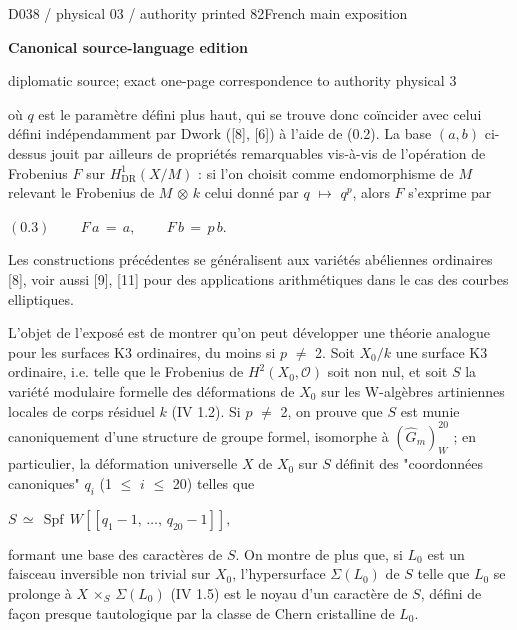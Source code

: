 \documentclass[9pt]{article}
\newcommand{\CanonText}[1]{\par{\fontsize{8.0}{9.35}\selectfont\RaggedRight #1\par}\vspace{2.2pt}}
\newcommand{\CanonDisplay}[1]{\par\vspace{1.2pt}\begin{center}{\fontsize{7.2}{8.4}\selectfont\(\displaystyle #1\)}\end{center}\vspace{1.2pt}}
\newcommand{\LayerTitle}{Canonical source-language edition}
\begin{document}
\noindent\begin{minipage}[t][\dimexpr\textheight-5pt\relax][t]{\textwidth}
{\sffamily\fontsize{7.3}{8.2}\selectfont\color{Quiet} D038 / physical 03 / authority printed 82\hfill French main exposition}
\par{}\vspace{4.5pt}
{\sffamily\fontsize{10.4}{11.6}\selectfont\bfseries\color{Accent} \LayerTitle}
\par{\sffamily\fontsize{6.7}{7.7}\selectfont\color{Quiet} diplomatic source; exact one-page correspondence to authority physical 3}
\vspace{5pt}
\CanonText{où \(q\) est le paramètre défini plus haut, qui se trouve donc coïncider avec celui défini indépendamment par Dwork ([8], [6]) à l'aide de (0.2). La base \((a,b)\) ci-dessus jouit par ailleurs de propriétés remarquables vis-à-vis de l'opération de Frobenius \(F\) sur \(H^{1}_{\mathrm{DR}}(X/M)\) : si l'on choisit comme endomorphisme de \(M\) relevant le Frobenius de \(M\) \(\otimes{}\) \(k\) celui donné par \(q\) \(\mapsto{}\) \(q^{p}\), alors \(F\) s'exprime par}
\CanonDisplay{(0.3)\qquad\,F\,a\,=\,a,\qquad\,F\,b\,=\,p\,b.}
\CanonText{Les constructions précédentes se généralisent aux variétés abéliennes ordinaires [8], voir aussi [9], [11] pour des applications arithmétiques dans le cas des courbes elliptiques.}
\CanonText{L'objet de l'exposé est de montrer qu'on peut développer une théorie analogue pour les surfaces K3 ordinaires, du moins si \(p\) \(\neq{}\) 2. Soit \(X_{0}/k\) une surface K3 ordinaire, i.e. telle que le Frobenius de \(H^{2}(X_{0},\mathcal{O})\) soit non nul, et soit \(S\) la variété modulaire formelle des déformations de \(X_{0}\) sur les W-algèbres artiniennes locales de corps résiduel \(k\) (IV 1.2). Si \(p\) \(\neq{}\) 2, on prouve que \(S\) est munie canoniquement d'une structure de groupe formel, isomorphe à \((\widehat{G}_{m})_{W}^{20}\) ; en particulier, la déformation universelle \(X\) de \(X_{0}\) sur \(S\) définit des "coordonnées canoniques" \(q_{i}\) (1 \(\leq{}\) \(i\) \(\leq{}\) 20) telles que}
\CanonDisplay{S\,\simeq{}\,\operatorname{Spf}\,W[[q_{1}-1,\,\ldots{},\,q_{20}-1]],}
\CanonText{formant une base des caractères de \(S\). On montre de plus que, si \(L_{0}\) est un faisceau inversible non trivial sur \(X_{0}\), l'hypersurface \(\Sigma{}(L_{0})\) de \(S\) telle que \(L_{0}\) se prolonge à \(X\) \(\times{}_{S}\) \(\Sigma{}(L_{0})\) (IV 1.5) est le noyau d'un caractère de \(S\), défini de façon presque tautologique par la classe de Chern cristalline de \(L_{0}\).}

\end{minipage}
\end{document}
